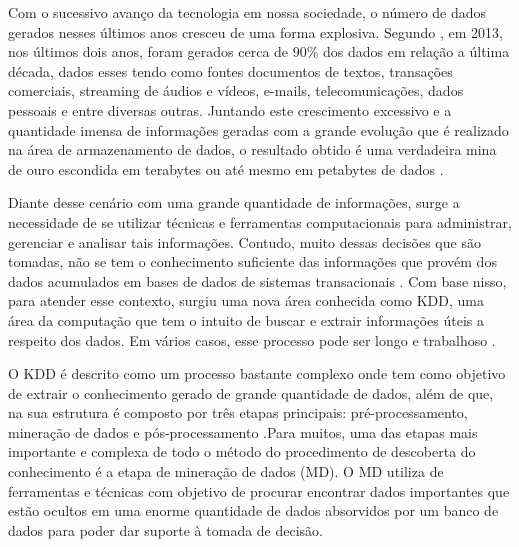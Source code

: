 
\par
Com o sucessivo avanço da tecnologia em nossa sociedade, o número de dados gerados nesses últimos anos cresceu de uma forma explosiva. Segundo , em 2013, nos últimos dois anos, foram gerados cerca de 90\% dos dados em relação a última década, dados esses tendo como fontes documentos de textos, transações comerciais, streaming de áudios e vídeos, e-mails, telecomunicações, dados pessoais e entre diversas outras. Juntando este crescimento excessivo e a quantidade imensa de informações geradas com a grande evolução que é realizado na área de armazenamento de dados, o resultado obtido é uma verdadeira mina de ouro escondida em terabytes ou até mesmo em petabytes de dados \cite{Carvalho2014}. 

\par
Diante desse cenário com uma grande quantidade de informações, surge a necessidade de se utilizar técnicas e ferramentas computacionais para administrar, gerenciar e analisar tais informações. Contudo, muito dessas decisões que são tomadas, não se tem o conhecimento suficiente das informações que provém dos dados acumulados em bases de dados de sistemas transacionais \cite{Rabelo2007}. Com base nisso, para atender esse contexto, surgiu uma nova área conhecida como KDD, uma área da computação que tem o intuito de buscar e extrair informações úteis a respeito dos dados. Em vários casos, esse processo pode ser longo e trabalhoso \cite{Stulp2014}.

\par
 O KDD é descrito como um processo bastante complexo onde tem como objetivo de extrair o conhecimento gerado de grande quantidade de dados, além de que, na sua estrutura é composto por três etapas principais: pré-processamento, mineração de dados e pós-processamento \cite{Rabelo2007}.Para muitos, uma das etapas mais importante e complexa de todo o método do procedimento de descoberta do conhecimento é a etapa de mineração de dados (MD). O MD utiliza de ferramentas e técnicas com objetivo de procurar encontrar dados importantes que estão ocultos em uma enorme quantidade de dados absorvidos por um banco de dados para poder dar suporte à tomada de decisão.


